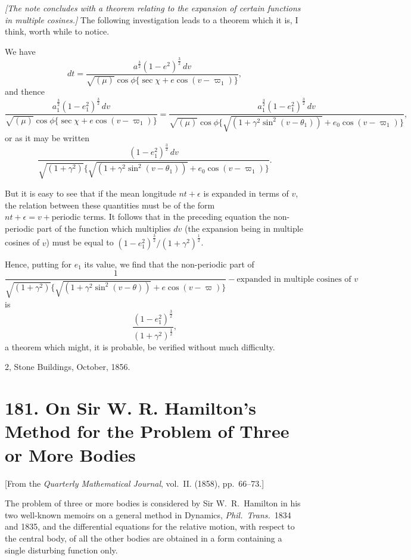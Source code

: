 \documentclass[12pt,a4paper]{article}
\theoremstyle{plain}
\theoremstyle{definition}
\begin{document}
\textit{[The note concludes with a theorem relating to the expansion of certain functions in multiple cosines.]} The following investigation leads to a theorem which it is, I think, worth while to notice.

We have
\[
dt = \frac{a^{\frac{3}{2}}(1 - e^2)^{\frac{3}{2}} \, dv}{\sqrt{(\mu)} \cos \phi \{\sec \chi + e \cos(v - \varpi_1)\}},
\]
and thence
\[
\frac{a_1^{\frac{3}{2}}(1 - e_1^2)^{\frac{3}{2}} \, dv}{\sqrt{(\mu)} \cos \phi \{\sec \chi + e \cos(v - \varpi_1)\}} = \frac{a_1^{\frac{3}{2}}(1 - e_1^2)^{\frac{3}{2}} \, dv}{\sqrt{(\mu)} \cos \phi \{\sqrt{(1 + \gamma^2 \sin^2(v - \theta_1))} + e_0 \cos(v - \varpi_1)\}},
\]
or as it may be written
\[
\frac{(1 - e_1^2)^{\frac{3}{2}} \, dv}{\sqrt{(1 + \gamma^2)} \{\sqrt{(1 + \gamma^2 \sin^2(v - \theta_1))} + e_0 \cos(v - \varpi_1)\}}.
\]

But it is easy to see that if the mean longitude $nt + \epsilon$ is expanded in terms of $v$, the relation between these quantities must be of the form $nt + \epsilon = v + \text{periodic terms}$. It follows that in the preceding equation the non-periodic part of the function which multiplies $dv$ (the expansion being in multiple cosines of $v$) must be equal to $(1 - e_1^2)^{\frac{3}{2}} / (1 + \gamma^2)^{\frac{1}{2}}$.

Hence, putting for $e_1$ its value, we find that the non-periodic part of
\[
\frac{1}{\sqrt{(1 + \gamma^2)} \{\sqrt{(1 + \gamma^2 \sin^2(v - \theta))} + e \cos(v - \varpi)\}} - \text{expanded in multiple cosines of } v
\]
is
\[
\frac{(1 - e_1^2)^{\frac{3}{2}}}{(1 + \gamma^2)^{\frac{1}{2}}},
\]
a theorem which might, it is probable, be verified without much difficulty.

\begin{flushright}
2, Stone Buildings, October, 1856.
\end{flushright}


\newpage
\section*{181. On Sir W. R. Hamilton's Method for the Problem of Three or More Bodies}

[From the \textit{Quarterly Mathematical Journal}, vol.~II. (1858), pp.~66--73.]

The problem of three or more bodies is considered by Sir W.~R.~Hamilton in his two well-known memoirs on a general method in Dynamics, \textit{Phil.\ Trans.}\ 1834 and 1835, and the differential equations for the relative motion, with respect to the central body, of all the other bodies are obtained in a form containing a single disturbing function only.
\end{document}
